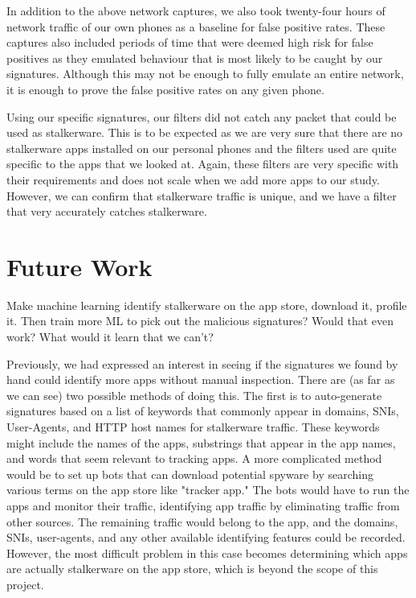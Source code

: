 \documentclass[acmtog]{acmart}
\begin{document}
In addition to the above network captures, we also took twenty-four hours of 
network traffic of our own phones as a baseline for false positive rates. These 
captures also included periods of time that were deemed high risk for false 
positives as they emulated behaviour that is most likely to be caught by our 
signatures. Although this may not be enough to fully emulate an entire network, 
it is enough to prove the false positive rates on any given phone.

Using our specific signatures, our filters did not catch any packet that could be used as stalkerware. This is to be expected as we are very sure that there are no stalkerware apps installed on our personal phones and the filters used are quite specific to the apps that we looked at. Again, these filters are very specific with their requirements and does not scale when we add more apps to our study. However, we can confirm that stalkerware traffic is unique, and we have a filter that very accurately catches stalkerware.





\section{Future Work}

Make machine learning identify stalkerware on the app store, download it, 
profile it. Then train more ML to pick out the malicious signatures? Would that 
even work? What would it learn that we can't?

Previously, we had expressed an interest in seeing if the signatures we found 
by hand could identify more apps without manual inspection. There are (as far 
as we can see) two possible methods of doing this. The first is to 
auto-generate signatures based on a list of keywords that commonly appear in 
domains, SNIs, User-Agents, and HTTP host names for stalkerware traffic. These 
keywords might include the names of the apps, substrings that appear in the app 
names, and words that seem relevant to tracking apps. A more complicated method 
would be to set up bots that can download potential spyware by searching 
various terms on the app store like "tracker app." The bots would have to run 
the apps and monitor their traffic, identifying app traffic by eliminating 
traffic from other sources. The remaining traffic would belong to the app, and 
the domains, SNIs, user-agents, and any other available identifying features 
could be recorded. However, the most difficult problem in this case becomes 
determining which apps are actually stalkerware on the app store, which is 
beyond the scope of this project. 
\end{document}
